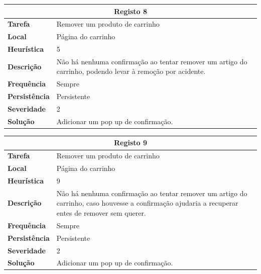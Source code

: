 \documentclass[a4paper,12pt]{article}
\begin{document}
\begin{center}
    \newpage
    \begin{table}[h!]
        \centering
        \begin{tabular}{|m{3cm}|m{12cm}|}
        \hline
        \multicolumn{2}{|c|}{\textbf{Registo 8}} \\ \hline
        \textbf{Tarefa}       & Remover um produto de carrinho \\ \hline
        \textbf{Local}        & Página do carrinho \\ \hline
        \textbf{Heurística}   & 5  \\ \hline
        \textbf{Descrição}    & Não há nenhuma confirmação ao tentar remover um artigo do carrinho, podendo levar à remoção por acidente. \\ \hline
        \textbf{Frequência}   & Sempre \\ \hline
        \textbf{Persistência} & Persistente \\ \hline
        \textbf{Severidade}   & 2 \\ \hline
        \textbf{Solução}      & Adicionar um pop up de confirmação. \\ \hline
        \end{tabular}
    \end{table}
    
    \begin{table}[h!]
        \centering
        \begin{tabular}{|m{3cm}|m{12cm}|}
        \hline
        \multicolumn{2}{|c|}{\textbf{Registo 9}} \\ \hline
        \textbf{Tarefa}       & Remover um produto de carrinho \\ \hline
        \textbf{Local}        & Página do carrinho \\ \hline
        \textbf{Heurística}   & 9  \\ \hline
        \textbf{Descrição}    & Não há nenhuma confirmação ao tentar remover um artigo do carrinho, caso houvesse a confirmação ajudaria a recuperar entes de remover sem querer. \\ \hline
        \textbf{Frequência}   & Sempre \\ \hline
        \textbf{Persistência} & Persistente \\ \hline
        \textbf{Severidade}   & 2 \\ \hline
        \textbf{Solução}      & Adicionar um pop up de confirmação. \\ \hline
        \end{tabular}
    \end{table}


\end{center}
\end{document}
